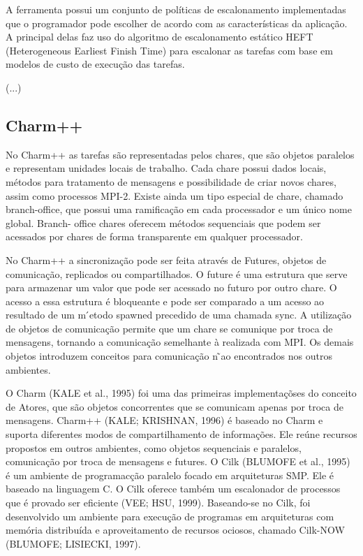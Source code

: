 A ferramenta possui um conjunto de políticas de escalonamento implementadas que o programador pode escolher de acordo com as características da aplicação. A principal delas faz uso do algoritmo de escalonamento estático HEFT (Heterogeneous Earliest Finish Time) para escalonar as tarefas com base em modelos de custo de execução das tarefas.

(...)

\subsection{Charm++}

No Charm++ as tarefas são representadas pelos chares, que são objetos paralelos e representam unidades locais de trabalho. Cada chare possui dados locais, métodos para tratamento de mensagens e possibilidade de criar novos chares, assim como processos MPI-2. Existe ainda um tipo especial de chare, chamado branch-office, que possui uma ramificação em cada processador e um único nome global. Branch- office chares oferecem métodos sequenciais que podem ser acessados por chares de forma transparente em qualquer processador.

No Charm++ a sincronização pode ser feita através de Futures, objetos de comunicação, replicados ou compartilhados. O future  é uma estrutura que serve para armazenar um valor que pode ser acessado no futuro por outro chare. O acesso a essa estrutura  é bloqueante e pode ser comparado a um acesso ao resultado de um m ́etodo spawned precedido de uma chamada sync. A utilização de objetos de comunicação permite que um chare se comunique por troca de mensagens, tornando a comunicação semelhante à realizada com MPI. Os demais objetos introduzem conceitos para comunicação n ̃ao encontrados nos outros ambientes.

O Charm (KALE et al., 1995) foi uma das primeiras implementaçõses do conceito de Atores, que são objetos concorrentes que se comunicam apenas por troca de mensagens. Charm++ (KALE; KRISHNAN, 1996) é baseado no Charm e suporta diferentes modos de compartilhamento de informações. Ele reúne recursos propostos em outros ambientes, como objetos sequenciais e paralelos, comunicação por troca de mensagens e futures. O Cilk (BLUMOFE et al., 1995)  é um ambiente de programacção paralelo focado em arquiteturas SMP. Ele  é baseado na linguagem C. O Cilk oferece também um escalonador de processos que é provado ser eficiente (VEE; HSU, 1999). Baseando-se no Cilk, foi desenvolvido um ambiente para execução de programas em arquiteturas com memória distribuída e aproveitamento de recursos ociosos, chamado Cilk-NOW (BLUMOFE; LISIECKI, 1997).

